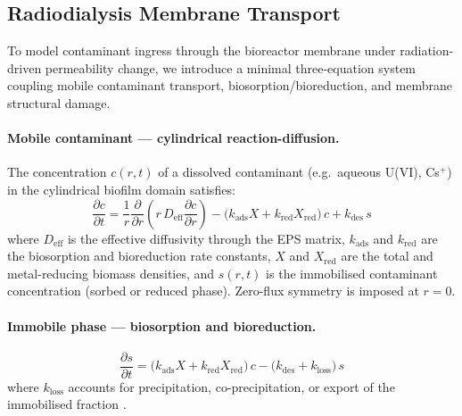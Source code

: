 \documentclass[11pt]{article}
\begin{document}
\subsection{Radiodialysis Membrane Transport}
\label{sec:radiodialysis}

To model contaminant ingress through the bioreactor membrane under radiation-driven
permeability change, we introduce a minimal three-equation system coupling mobile
contaminant transport, biosorption/bioreduction, and membrane structural damage.

\paragraph{Mobile contaminant --- cylindrical reaction-diffusion.}
The concentration $c(r,t)$ of a dissolved contaminant (e.g.\ aqueous U(VI), Cs$^+$) in the
cylindrical biofilm domain satisfies:
\begin{equation}
\frac{\partial c}{\partial t}
  = \frac{1}{r}\frac{\partial}{\partial r}\!\left(r\,D_{\mathrm{eff}}\frac{\partial c}{\partial r}\right)
  - \bigl(k_{\mathrm{ads}}X + k_{\mathrm{red}}X_{\mathrm{red}}\bigr)\,c
  + k_{\mathrm{des}}\,s
\label{eq:mobile}
\end{equation}
where $D_{\mathrm{eff}}$ is the effective diffusivity through the EPS matrix,
$k_{\mathrm{ads}}$ and $k_{\mathrm{red}}$ are the biosorption and bioreduction rate constants,
$X$ and $X_{\mathrm{red}}$ are the total and metal-reducing biomass densities, and $s(r,t)$
is the immobilised contaminant concentration (sorbed or reduced phase).
Zero-flux symmetry is imposed at $r = 0$.

\paragraph{Immobile phase --- biosorption and bioreduction.}
\begin{equation}
\frac{\partial s}{\partial t}
  = \bigl(k_{\mathrm{ads}}X + k_{\mathrm{red}}X_{\mathrm{red}}\bigr)\,c
  - \bigl(k_{\mathrm{des}} + k_{\mathrm{loss}}\bigr)\,s
\label{eq:immobile}
\end{equation}
where $k_{\mathrm{loss}}$ accounts for precipitation, co-precipitation, or export of the
immobilised fraction \cite{renslow2017}.
\end{document}
